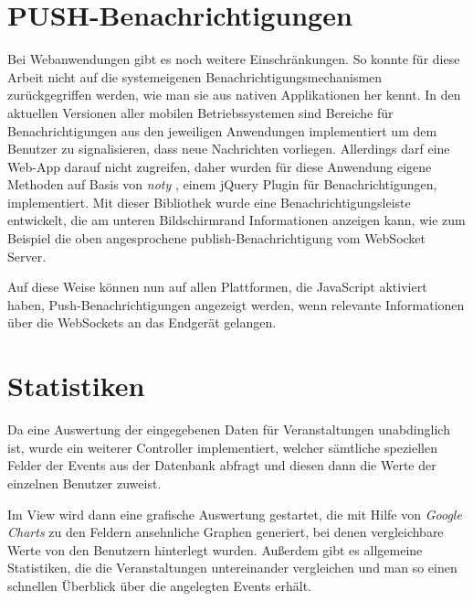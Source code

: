 \section{PUSH-Benachrichtigungen}
Bei Webanwendungen gibt es noch weitere Einschränkungen. So konnte für diese Arbeit nicht auf die systemeigenen Benachrichtigungsmechanismen zurückgegriffen werden, wie man sie aus nativen Applikationen her kennt. In den aktuellen Versionen aller mobilen Betriebssystemen sind Bereiche für Benachrichtigungen aus den jeweiligen Anwendungen implementiert um dem Benutzer zu signalisieren, dass neue Nachrichten vorliegen. Allerdings darf eine Web-App darauf nicht zugreifen, daher wurden für diese Anwendung eigene Methoden auf Basis von \emph{noty} \cite{noty}, einem jQuery Plugin für Benachrichtigungen, implementiert. Mit dieser Bibliothek wurde eine Benachrichtigungsleiste entwickelt, die am unteren Bildschirmrand Informationen anzeigen kann, wie zum Beispiel die oben angesprochene publish-Benachrichtigung vom WebSocket Server.\par

Auf diese Weise können nun auf allen Plattformen, die JavaScript aktiviert haben, Push-Benachrichtigungen angezeigt werden, wenn relevante Informationen über die WebSockets an das Endgerät gelangen.


\section{Statistiken}
Da eine Auswertung der eingegebenen Daten für Veranstaltungen unabdinglich ist, wurde ein weiterer Controller implementiert, welcher sämtliche speziellen Felder der Events aus der Datenbank abfragt und diesen dann die Werte der einzelnen Benutzer zuweist.\par

Im View wird dann eine grafische Auswertung gestartet, die mit Hilfe von \emph{Google Charts} \cite{google:charts} zu den Feldern ansehnliche Graphen generiert, bei denen vergleichbare Werte von den Benutzern hinterlegt wurden. Außerdem gibt es allgemeine Statistiken, die die Veranstaltungen untereinander vergleichen und man so einen schnellen Überblick über die angelegten Events erhält.